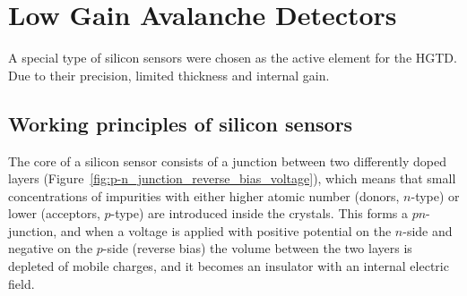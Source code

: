 \section{Low Gain Avalanche Detectors}\label{sec:LGADs}

A special type of silicon sensors were chosen as the active element for the HGTD. Due to their precision, limited thickness and internal gain.

\subsection{Working principles of silicon sensors}

The core of a silicon sensor consists of a junction between two differently doped layers (Figure~\ref{fig:p-n_junction_reverse_bias_voltage}), which means that small concentrations of impurities with either higher atomic number (donors, \(n\)-type) or lower (acceptors, \(p\)-type) are introduced inside the crystals.
This forms a \(pn\)-junction, and when a voltage is applied with positive potential on the \(n\)-side and negative on the \(p\)-side (reverse bias) the volume between the two layers is depleted of mobile charges, and it becomes an insulator with an internal electric field.

